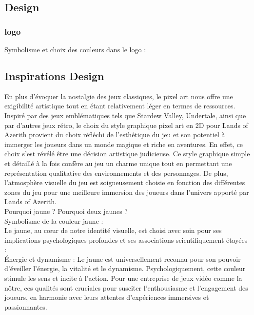 
\subsection{Design}

\subsubsection{logo}
Symbolisme et choix des couleurs dans le logo :

\subsection{Inspirations Design}

En plus d'évoquer la nostalgie des jeux classiques, le pixel art nous offre une exigibilité artistique tout en étant relativement léger en termes de ressources.
Inspiré par des jeux emblématiques tels que Stardew Valley, Undertale, ainsi que par d'autres jeux rétro, le choix du style graphique pixel art en 2D pour Lands of Azerith provient du choix réfléchi de l'esthétique du jeu et son potentiel à immerger les joueurs dans un monde magique et riche en aventures.
En effet, ce choix s'est révélé être une décision artistique judicieuse.
Ce style graphique simple et détaillé à la fois confère au jeu un charme unique tout en permettant une représentation qualitative des environnements et des personnages.
De plus, l'atmosphère visuelle du jeu est soigneusement choisie en fonction des différentes zones du jeu pour une meilleure immersion des joueurs dans l'univers apporté par Lands of Azerith.
\\

Pourquoi jaune ? Pourquoi deux jaunes ?
\\

Symbolisme de la couleur jaune :
\\

Le jaune, au cœur de notre identité visuelle, est choisi avec soin pour ses implications psychologiques profondes et ses associations scientifiquement étayées :
\\

Énergie et dynamisme : Le jaune est universellement reconnu pour son pouvoir d'éveiller l'énergie, la vitalité et le dynamisme. Psychologiquement, cette couleur stimule les sens et incite à l'action. Pour une entreprise de jeux vidéo comme la nôtre, ces qualités sont cruciales pour susciter l'enthousiasme et l'engagement des joueurs, en harmonie avec leurs attentes d'expériences immersives et passionnantes.
\\

